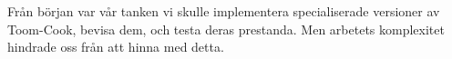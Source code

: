 Från början var vår tanken vi skulle implementera specialiserade versioner av
Toom-Cook, bevisa dem, och testa deras prestanda. Men arbetets komplexitet
hindrade oss från att hinna med detta.

